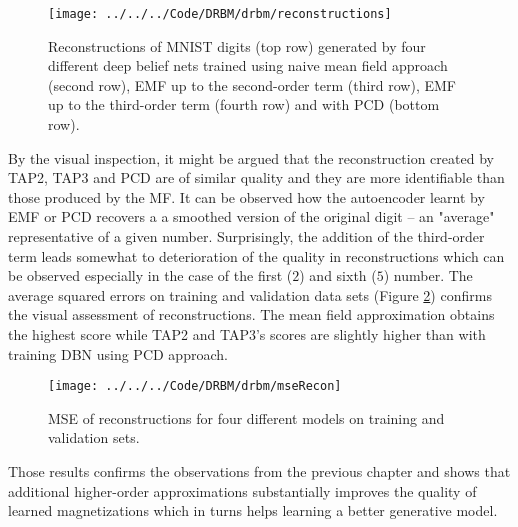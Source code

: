 \begin{figure}[!htb]
\texttt{[image: ../../../Code/DRBM/drbm/reconstructions]}
  \caption[Reconstructions of digits with deep structures]{Reconstructions of MNIST digits (top row) generated by four different deep belief nets trained using naive mean field approach (second row), EMF up to the second-order term (third row), EMF up to the third-order term (fourth row) and with PCD (bottom row).}
\label{fig:drbm}
\end{figure}
  
By the visual inspection, it might be argued that the reconstruction created by TAP2, TAP3 and PCD are of similar quality and they are more identifiable than those produced by the MF. 
It can be observed how the autoencoder learnt by EMF or PCD recovers a a smoothed version of the original digit -- an "average" representative of a given number. Surprisingly, the addition of the third-order term leads somewhat to deterioration of the quality in reconstructions which can be observed especially in the case of the first ($2$) and sixth ($5$) number. 
The average squared errors on training and validation data sets (Figure \ref{fig:mse}) confirms the visual assessment of reconstructions. The mean field approximation obtains the highest score while TAP2 and TAP3's scores are slightly higher than with training DBN using PCD approach. 

\begin{figure}[!htb]
\begin{center}
\texttt{[image: ../../../Code/DRBM/drbm/mseRecon]}
\end{center}
  \caption[MSE of digits' reconstructions with different deep models]{MSE of reconstructions for four different models on training and validation sets.}
\label{fig:mse}
\end{figure}

Those results confirms the observations from the previous chapter and shows that additional higher-order approximations substantially improves the quality of learned magnetizations which in turns helps learning a better generative model.

